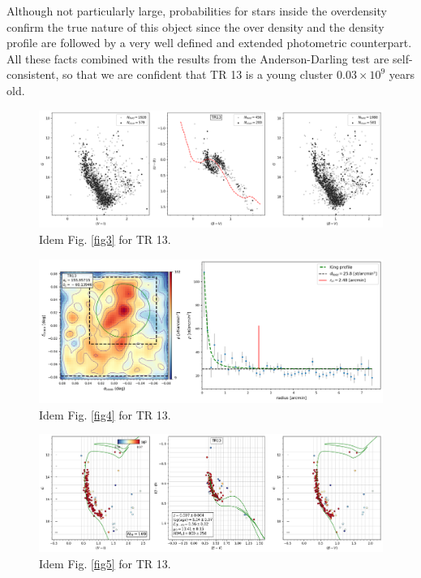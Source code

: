 \documentclass[draft]{aa}
\begin{document}
Although not particularly large, probabilities for stars inside the
overdensity confirm the true nature of this object since the over density
and the density profile are followed by a very well defined and extended
photometric counterpart. All these facts combined with the results from the
Anderson-Darling test are self-consistent, so that we are confident that
TR 13 is a young cluster $0.03\times10^9$ years old.

\begin{figure}[ht]
    \centering
    \includegraphics[width=\hsize]{../figs/obs_TR13.png}
    \caption{Idem Fig. \ref{fig3} for TR 13.}
    \label{fig39}
\end{figure}
\begin{figure}[ht]
    \centering
    \includegraphics[width=\hsize]{../figs/dmap_trumpler13.png}
    \caption{Idem Fig. \ref{fig4} for TR 13.}
    \label{fig40}
\end{figure}
\begin{figure}[ht]
    \centering
    \includegraphics[width=\hsize]{../figs/cmds_tr13.png}
    \caption{Idem Fig. \ref{fig5} for TR 13.}
    \label{fig41}
\end{figure}
\end{document}
